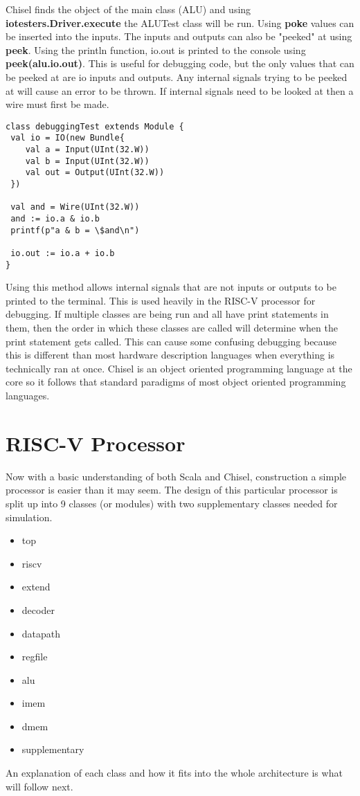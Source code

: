 \documentclass[12pt, letterpaper]{report}
\begin{document}
Chisel finds the object of the main class (ALU) and using 
\textbf{iotesters.Driver.execute} the ALUTest class will be run.
Using \textbf{poke} values can be inserted into the inputs. The inputs and outputs can also be "peeked" at using \textbf{peek}.
Using the println function, io.out is printed to the console using \textbf{peek(alu.io.out)}. 
This is useful for debugging code, but the only values that can be peeked at are io inputs and outputs. 
Any internal signals trying to be peeked at will cause an error to be thrown. If internal signals need to 
be looked at then a wire must first be made.
\pagebreak
\begin{lstlisting}[style=scala]
class debuggingTest extends Module {
 val io = IO(new Bundle{
    val a = Input(UInt(32.W))
    val b = Input(UInt(32.W))
    val out = Output(UInt(32.W))
 })

 val and = Wire(UInt(32.W))
 and := io.a & io.b
 printf(p"a & b = \$and\n")

 io.out := io.a + io.b
}
\end{lstlisting}

Using this method allows internal signals that are not inputs or outputs to be printed to the terminal. This is used heavily in 
the RISC-V processor for debugging. If multiple classes are being run and all have print statements in them, then the order in 
which these classes are called will determine when the print statement gets called. This can cause some confusing debugging because 
this is different than most hardware description languages when everything is technically ran at once. Chisel is an object oriented 
programming language at the core so it follows that standard paradigms of most object oriented programming languages.




\chapter{RISC-V Processor}
Now with a basic understanding of both Scala and Chisel, construction a simple processor is easier than it may seem. The design of 
this particular processor is split up into 9 classes (or modules)
with two supplementary classes needed for simulation.
\begin{itemize}
   \item top
   \item riscv
   \item extend
   \item decoder
   \item datapath
   \item regfile
   \item alu
   \item imem
   \item dmem
   \item supplementary
\end{itemize}
An explanation of each class and how it fits into the whole architecture is what will follow next.
\end{document}
